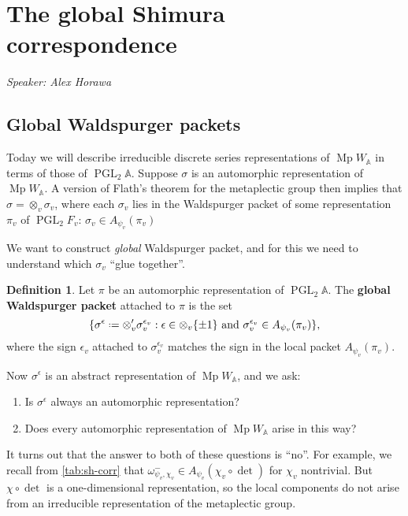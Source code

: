 \documentclass[11pt,a4paper,leqno]{article}
\newcommand{\A}{\mathbb{A}}
\newcommand{\1}{\mathbbm{1}}
\newcommand*{\defeq}{\mathrel{\vcenter{\baselineskip0.5ex \lineskiplimit0pt
      \hbox{\scriptsize.}\hbox{\scriptsize.}}}%
  =}
\DeclareMathOperator{\Mp}{Mp}
\DeclareMathOperator{\PGL}{PGL}
\newcounter{questions}
\theoremstyle{plain}
\theoremstyle{definition}
\newtheorem{definition}[theorem]{Definition}
\theoremstyle{remark}
\numberwithin{equation}{section}
\begin{document}
\section{The global Shimura correspondence}
\label{sec:glob-shim-corr}
\emph{Speaker: Alex Horawa}

\subsection{Global Waldspurger packets}
\label{sec:glob-waldsp-pack}

Today we will describe irreducible discrete series representations of
$\Mp W_{\A}$ in terms of those of $\PGL_{2}\A$. Suppose $\sigma$ is an
automorphic representation of $\Mp W_{\A}$. A version of Flath's
theorem for the metaplectic group then implies that $\sigma = \otimes_{v}\sigma_{v}$,
where each $\sigma_{v}$ lies in the Waldspurger packet of some
representation $\pi_{v}$ of $\PGL_{2} F_{v}$: $\sigma_{v} \in A_{\psi_{v}} (\pi_{v})$ 

We want to construct \emph{global} Waldspurger packet, and for this we
need to understand which $\sigma_{v}$ ``glue together''.

\begin{definition}
  Let $\pi$ be an automorphic representation of $\PGL_{2}\A$. The
  \textbf{global Waldspurger packet} attached to $\pi$ is the set
  \begin{equation}
    \label{eq:25}
\{ \sigma^{\epsilon} \defeq \otimes_{v}' \sigma_{v}^{\epsilon_{v}} : \epsilon \in \otimes_{v} \{\pm 1\} \text{ and }
\sigma_{v}^{\epsilon_{v}} \in A_{\psi_{v}}(\pi_{v})\},
  \end{equation}
where the sign $\epsilon_{v}$ attached to $\sigma_{v}^{\epsilon_{v}}$ matches the sign in
the local packet $A_{\psi_{v}}(\pi_{v})$.
\end{definition}
Now $\sigma^{\epsilon}$ is an abstract representation of $\Mp W_{\A}$, and we ask:
\begin{enumerate}
\item Is $\sigma^{\epsilon}$ always an automorphic representation?
\item Does every automorphic representation of $\Mp W_{\A}$ arise in
  this way?
\end{enumerate}
It turns out that the answer to both of these questions is ``no''.
For example, we recall from \cref{tab:sh-corr} that $ \omega_{\psi_{v}, \chi_{v}}^{-} \in
A_{\psi_{v}}(\chi_{v}\circ \det)$ for $\chi_{v}$ nontrivial. But $\chi \circ \det$ is a
one-dimensional representation, so the local components do not arise 
from an irreducible representation of the metaplectic group.
\end{document}
